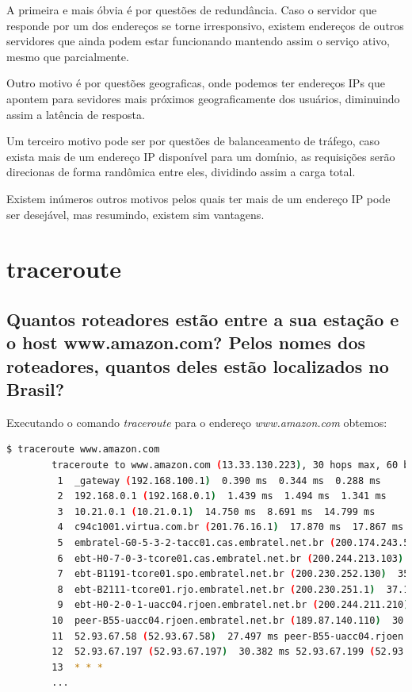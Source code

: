 \documentclass[12pt,a4paper]{report}
\begin{document}
A primeira e mais óbvia é por questões de redundância. Caso o servidor que responde por um dos endereços se torne irresponsivo, existem endereços de outros servidores que ainda podem estar funcionando mantendo assim o serviço ativo, mesmo que parcialmente.

Outro motivo é por questões geograficas, onde podemos ter endereços IPs que apontem para sevidores mais próximos geograficamente dos usuários, diminuindo assim a latência de resposta.

Um terceiro motivo pode ser por questões de balanceamento de tráfego, caso exista mais de um endereço IP disponível para um domínio, as requisições serão direcionas de forma randômica entre eles, dividindo assim a carga total.

Existem inúmeros outros motivos pelos quais ter mais de um endereço IP pode ser desejável, mas resumindo, existem sim vantagens.

\section{traceroute}
\subsection{Quantos roteadores estão entre a sua estação e o host www.amazon.com? Pelos nomes dos roteadores, quantos deles estão localizados no Brasil?}

Executando o comando \emph{traceroute} para o endereço \emph{www.amazon.com} obtemos:

\begin{lstlisting}[language=bash]
        $ traceroute www.amazon.com   
        traceroute to www.amazon.com (13.33.130.223), 30 hops max, 60 byte packets
         1  _gateway (192.168.100.1)  0.390 ms  0.344 ms  0.288 ms
         2  192.168.0.1 (192.168.0.1)  1.439 ms  1.494 ms  1.341 ms
         3  10.21.0.1 (10.21.0.1)  14.750 ms  8.691 ms  14.799 ms
         4  c94c1001.virtua.com.br (201.76.16.1)  17.870 ms  17.867 ms  18.191 ms
         5  embratel-G0-5-3-2-tacc01.cas.embratel.net.br (200.174.243.53)  20.587 ms embratel-T0-3-0-0-uacc02.cas.embratel.net.br (189.16.179.53)  22.126 ms  22.086 ms
         6  ebt-H0-7-0-3-tcore01.cas.embratel.net.br (200.244.213.103)  33.239 ms ebt-H0-4-0-0-tcore01.cas.embratel.net.br (200.244.212.61)  36.143 ms ebt-H0-7-0-3-tcore01.cas.embratel.net.br (200.244.213.103)  24.095 ms
         7  ebt-B1191-tcore01.spo.embratel.net.br (200.230.252.130)  35.167 ms  33.017 ms  24.929 ms
         8  ebt-B2111-tcore01.rjo.embratel.net.br (200.230.251.1)  37.181 ms  31.957 ms  33.497 ms
         9  ebt-H0-2-0-1-uacc04.rjoen.embratel.net.br (200.244.211.210)  30.454 ms  30.465 ms ebt-H0-7-0-1-uacc04.rjoen.embratel.net.br (200.244.211.214)  30.384 ms
        10  peer-B55-uacc04.rjoen.embratel.net.br (189.87.140.110)  30.038 ms  28.433 ms  28.439 ms
        11  52.93.67.58 (52.93.67.58)  27.497 ms peer-B55-uacc04.rjoen.embratel.net.br (189.87.140.110)  26.865 ms  21.708 ms
        12  52.93.67.197 (52.93.67.197)  30.382 ms 52.93.67.199 (52.93.67.199)  30.470 ms *
        13  * * *
        ...
\end{lstlisting}
\end{document}
